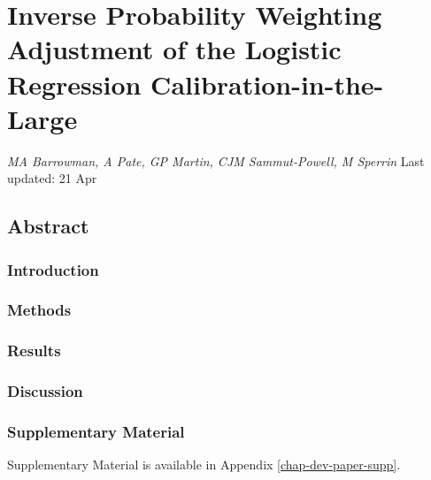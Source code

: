 \documentclass[12pt,PhD,twoside,openright]{muthesis}
\begin{document}
\hypertarget{chap-IPCW-logistic}{%
\chapter{Inverse Probability Weighting Adjustment of the Logistic Regression Calibration-in-the-Large}\label{chap-IPCW-logistic}}

\emph{MA Barrowman, A Pate, GP Martin, CJM Sammut-Powell, M Sperrin}
Last updated: 21 Apr

\hypertarget{abstract-1}{%
\section*{Abstract}\label{abstract-1}}

\hypertarget{introduction-3}{%
\subsection*{Introduction}\label{introduction-3}}

\hypertarget{methods-3}{%
\subsection*{Methods}\label{methods-3}}

\hypertarget{results-2}{%
\subsection*{Results}\label{results-2}}

\hypertarget{discussion-1}{%
\subsection*{Discussion}\label{discussion-1}}

\hypertarget{supplementary-material-1}{%
\subsection*{Supplementary Material}\label{supplementary-material-1}}

Supplementary Material is available in Appendix \ref{chap-dev-paper-supp}.
\end{document}
